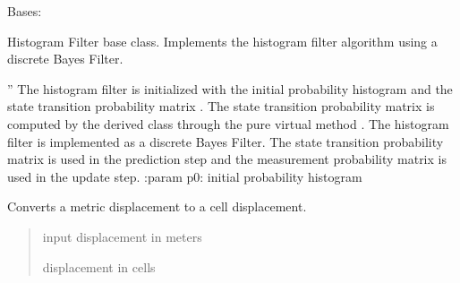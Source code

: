 \documentclass[letterpaper,10pt,english]{sphinxmanual}
\begin{document}
\begin{fulllineitems}
\label{\detokenize{HF:HF.HF}}
\pysigstartsignatures
{}
\pysigstopsignatures
\sphinxAtStartPar
Bases: 

\sphinxAtStartPar
Histogram Filter base class. Implements the histogram filter algorithm using a discrete Bayes Filter.

\begin{fulllineitems}
\label{\detokenize{HF:HF.HF.__init__}}
\pysigstartsignatures
{}
\pysigstopsignatures
\sphinxAtStartPar
”
The histogram filter is initialized with the initial probability histogram  and the state transition probability matrix . The state transition probability matrix is computed by the derived class through the pure virtual method .
The histogram filter is implemented as a discrete Bayes Filter. The state transition probability matrix is used in the prediction step and the measurement probability matrix is used in the update step.
:param p0: initial probability histogram

\end{fulllineitems}


\begin{fulllineitems}
\label{\detokenize{HF:HF.HF.ToCell}}
\pysigstartsignatures
{}
\pysigstopsignatures
\sphinxAtStartPar
Converts a metric displacement to a cell displacement.
\begin{quote}\begin{description}
\sphinxAtStartPar
{} \textendash{} input displacement in meters

\sphinxAtStartPar
displacement in cells


\end{description}
\end{quote}
\end{fulllineitems}
\end{fulllineitems}
\end{document}
